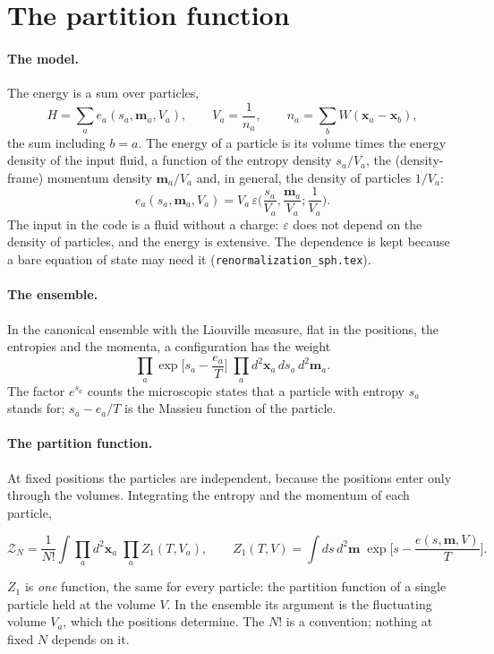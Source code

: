 \documentclass[11pt,aps,preprint,nofootinbib,superscriptaddress,tightenlines]{revtex4-2}
\def\st{\begin{equation}}
\def\stp{\end{equation}}
\let\oldparagraph\paragraph
\renewcommand{\paragraph}{\par\bigskip\oldparagraph}
\begin{document}
\section{The partition function}
\label{sec:Z}

\paragraph{The model.}  The energy is a sum over particles,
\st
H=\sum_ae_a(s_a,\bm m_a,V_a),\qquad V_a=\frac1{n_a},\qquad n_a=\sum_bW(\bm x_a-\bm x_b),
\stp
the sum including $b=a$.  The energy of a particle is its volume times the energy density of the input fluid, a function of the entropy density
$s_a/V_a$, the (density-frame) momentum density $\bm m_a/V_a$ and, in general, the density of particles $1/V_a$:
\st
e_a(s_a,\bm m_a,V_a)=V_a\,\varepsilon\Big(\frac{s_a}{V_a},\frac{\bm m_a}{V_a};\frac1{V_a}\Big).
\stp
The input in the code is a fluid without a charge: $\varepsilon$ does not depend on the density of particles, and the energy is extensive.  The dependence is kept
because a bare equation of state may need it (\nolinkurl{renormalization_sph.tex}).

\paragraph{The ensemble.}  In the canonical ensemble with the Liouville measure, flat in the positions, the entropies and the momenta, a configuration
has the weight
\st
\prod_a\exp\Big[s_a-\frac{e_a}{T}\Big]\;\prod_ad^2\bm x_a\,ds_a\,d^2\bm m_a .
\stp
The factor $e^{s_a}$ counts the microscopic states that a particle with entropy $s_a$ stands for; $s_a-e_a/T$ is the Massieu function of the particle.

\paragraph{The partition function.}  At fixed positions the particles are independent, because the positions enter only through the volumes.
Integrating the entropy and the momentum of each particle,
\begin{keyeq}
\st
\mathcal Z_N=\frac1{N!}\int\prod_ad^2\bm x_a\;\prod_aZ_1(T,V_a),\qquad
Z_1(T,V)=\int ds\,d^2\bm m\;\exp\Big[s-\frac{e(s,\bm m,V)}{T}\Big] .
\label{ZN}
\stp
\end{keyeq}
$Z_1$ is \emph{one} function, the same for every particle: the partition function of a single particle held at the volume $V$.  In the ensemble its
argument is the fluctuating volume $V_a$, which the positions determine.  The $N!$ is a convention; nothing at fixed $N$ depends on it.
\end{document}
